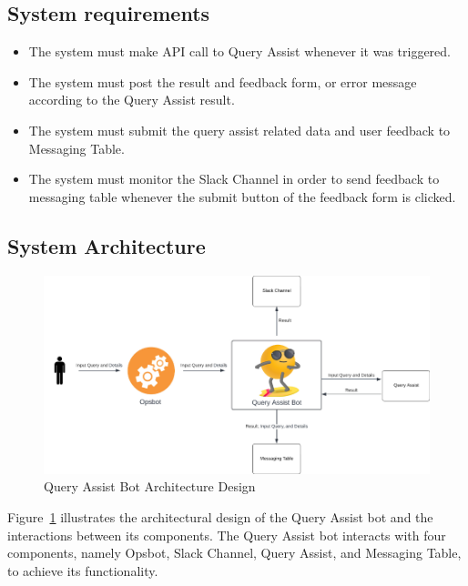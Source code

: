     \subsection{System requirements}
    \begin{itemize}
        \item  The system must make API call to Query Assist whenever it was triggered.
        \item  The system must post the result and feedback form, or error message according to the Query Assist result.
        \item  The system must submit the query assist related data and user feedback to Messaging Table.
        \item  The system must monitor the Slack Channel in order to send feedback to messaging table whenever the submit button of the feedback form is clicked.
    \end{itemize}

    \subsection{System Architecture}
    \begin{figure}[H]
        \centering
        \includegraphics[width=15cm]{chapters/3/figures/bot_architecture.png}
        \caption[Query Assist Bot Architecture Design]{Query Assist Bot Architecture Design}
        \label{fig:bot_architecture_design}
    \end{figure}
    Figure~\ref{fig:bot_architecture_design} illustrates the architectural design of the Query Assist bot and the interactions between its components. The Query Assist bot interacts with four components, namely Opsbot, Slack Channel, Query Assist, and Messaging Table, to achieve its functionality.

